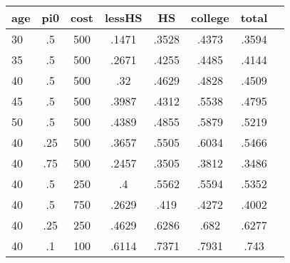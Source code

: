 \begin{table}[htbp]
\begin{tabular}{lccccccc} \hline \hline
 \multicolumn{1}{c}{ age }  & pi0  & cost  & lessHS  & HS  & college  & total  \\  \hline 
       30 &        .5 &       500 &     .1471 &     .3528 &     .4373 &     .3594 \\  
       35 &        .5 &       500 &     .2671 &     .4255 &     .4485 &     .4144 \\  
       40 &        .5 &       500 &       .32 &     .4629 &     .4828 &     .4509 \\  
       45 &        .5 &       500 &     .3987 &     .4312 &     .5538 &     .4795 \\  
       50 &        .5 &       500 &     .4389 &     .4855 &     .5879 &     .5219 \\  
       40 &       .25 &       500 &     .3657 &     .5505 &     .6034 &     .5466 \\  
       40 &       .75 &       500 &     .2457 &     .3505 &     .3812 &     .3486 \\  
       40 &        .5 &       250 &        .4 &     .5562 &     .5594 &     .5352 \\  
       40 &        .5 &       750 &     .2629 &      .419 &     .4272 &     .4002 \\  
       40 &       .25 &       250 &     .4629 &     .6286 &      .682 &     .6277 \\  
       40 &        .1 &       100 &     .6114 &     .7371 &     .7931 &      .743 \\  
\hline \hline \end{tabular}
\end{table}
